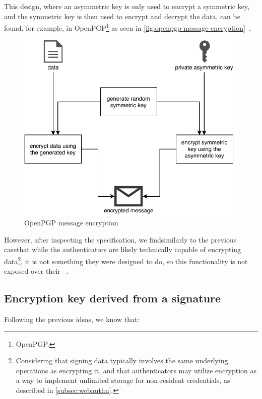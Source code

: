 This design, where an asymmetric key is only used to encrypt a symmetric key, and the symmetric key is then used to encrypt and decrypt the data,
can be found, for example, in \gls{OpenPGP}\footnote{\Glsdesc{OpenPGP}.} as seen in \autoref{fig:openpgp-message-encryption}~\cite{rfc4880}.

\begin{figure}[H]
	\centering\includegraphics[width=\textwidth]{images/pgp}
	\caption{OpenPGP message encryption}
	\label{fig:openpgp-message-encryption}
\end{figure}

However, after inspecting the  specification, we find\textemdash similarly to the previous case\textemdash that while the authenticators
are likely technically capable of encrypting data\footnote{
	Considering that signing data typically involves the same underlying operations as encrypting it,
	and that authenticators may utilize encryption as a way to implement unlimited storage for non-resident credentials, as described in \autoref{subsec:webauthn}.
}, it is not something they were designed to do, so this functionality is not exposed
over their ~\cite{fido:ctap}.

\subsection{Encryption key derived from a signature}\label{subsec:encryption-key-derived-from-a-signature}

Following the previous ideas, we know that:

